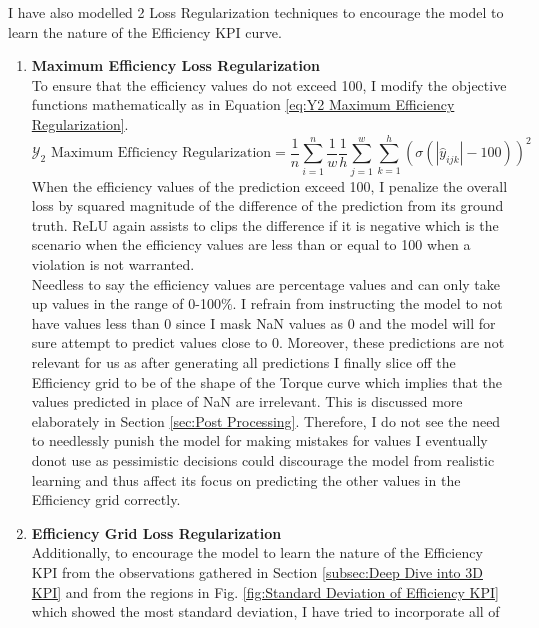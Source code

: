 \documentclass{report} %
\begin{document}
I have also modelled 2 Loss Regularization techniques to encourage the model to learn the nature of the Efficiency \ac{KPI} curve.
\begin{enumerate}
\item \textbf{Maximum Efficiency Loss Regularization} \\
To ensure that the efficiency values do not exceed 100, I modify the objective functions mathematically as in Equation \ref{eq:Y2 Maximum Efficiency Regularization}.
\begin{equation}
\text{$\mathcal{Y}_2$ Maximum Efficiency Regularization} = \frac{1}{n} \sum_{i=1}^{n}\frac{1}{w} \frac{1}{h} \sum_{j=1}^{w} \sum_{k=1}^{h}\left(\sigma(|\hat{y}_{ijk}| - 100)\right)^2 
\label{eq:Y2 Maximum Efficiency Regularization}
\end{equation} 
\vspace{0.2cm} 
When the efficiency values of the prediction exceed 100, I penalize the overall loss by squared magnitude of the difference of the prediction from its ground truth.
\ac{ReLU} again assists to clips the difference if it is negative which is the scenario when the efficiency values are less than or equal to 100 when a violation is not warranted. \\
Needless to say the efficiency values are percentage values and can only take up values in the range of 0-100\%.
I refrain from instructing the model to not have values less than 0 since I mask \ac{NaN} values as 0 and the model will for sure attempt to predict values close to 0.
Moreover, these predictions are not relevant for us as after generating all predictions I finally slice off the Efficiency grid to be of the shape of the Torque curve 
which implies that the values predicted in place of \ac{NaN} are irrelevant. This is discussed more elaborately in Section \ref{sec:Post Processing}.
Therefore, I do not see the need to needlessly punish the model for making mistakes for values I eventually donot use as pessimistic decisions could discourage the model 
from realistic learning and thus affect its focus on predicting the other values in the Efficiency grid correctly.
\item \textbf{Efficiency Grid Loss Regularization} \\
Additionally, to encourage the model to learn the nature of the Efficiency \ac{KPI} from the observations gathered in Section \ref{subsec:Deep Dive into 3D KPI} and from 
the regions in Fig. \ref{fig:Standard Deviation of Efficiency KPI} which showed the most standard deviation, I have tried to incorporate all of 

\end{enumerate}
\end{document}
